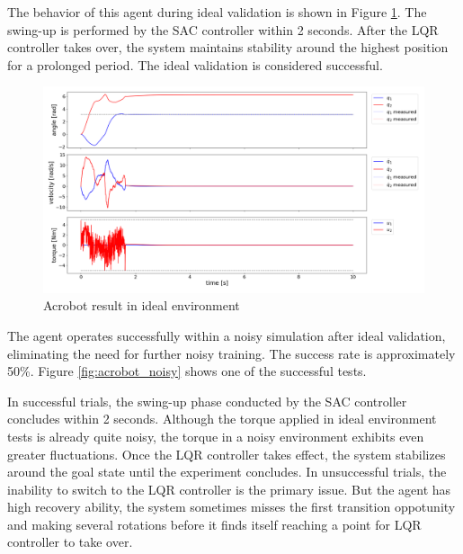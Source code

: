 The behavior of this agent during ideal validation is shown in Figure \ref{fig:acrobot_ideal}. The swing-up is performed by the SAC controller within 2 seconds. After the LQR controller takes over, the system maintains stability around the highest position for a prolonged period. The ideal validation is considered successful.

\begin{figure}[H]
    \centering
    \includegraphics[width=0.95\linewidth]{figures/hardware_result/acrobot_ideal_simulation_designC.1.png}
    \caption{Acrobot result in ideal environment}
    \label{fig:acrobot_ideal}
\end{figure}

The agent operates successfully within a noisy simulation after ideal validation, eliminating the need for further noisy training. The success rate is approximately 50\%. Figure \ref{fig:acrobot_noisy} shows one of the successful tests.

In successful trials, the swing-up phase conducted by the SAC controller concludes within 2 seconds. Although the torque applied in ideal environment tests is already quite noisy, the torque in a noisy environment exhibits even greater fluctuations. Once the LQR controller takes effect, the system stabilizes around the goal state until the experiment concludes. In unsuccessful trials, the inability to switch to the LQR controller is the primary issue. But the agent has high recovery ability, the system sometimes misses the first transition oppotunity and making several rotations before it finds itself reaching a point for LQR controller to take over.

